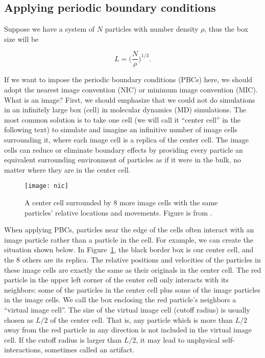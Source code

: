 \subsection{Applying periodic boundary conditions}\label{ssec:pbcs}

Suppose we have a system of \(N\) particles with number density \(\rho\), thus the
box size will be

\begin{equation}\label{eq:L}
    L = \biggl( \frac{ N }{ \rho } \biggr)^{1 / 3}.
\end{equation}

If we want to impose the periodic boundary conditions (PBCs) here, we should adopt the
nearest image convention (NIC) or minimum image convention (MIC). What is an image? First,
we should emphasize that we could not do simulations in an infinitely large box (cell) in
molecular dynamics (MD)
simulations. The most common solution is to take one cell (we will call it ``center cell''
in the following text) to simulate and imagine an infinitive number of image cells
surrounding it, where each image cell is a replica of the center cell. The image cells can
reduce or eliminate boundary effects by providing every particle an equivalent surrounding
environment of particles as if it were in the bulk, no matter where they are in the center
cell.

\begin{figure}[h]
    \centering
    \texttt{[image: nic]}
    \caption{A center cell surrounded by \(8\) more image cells with the same
        particles' relative locations and movements. Figure is from \cite{matlab}.}
    \label{fig:nic}
\end{figure}

When applying PBCs, particles near the edge of the cells often interact
with an image particle rather than a particle in the cell. For example, we can create the
situation shown below.
In Figure~\ref{fig:nic}, the black border box is our center cell, and the \(8\) others are
its replica. The relative positions and velocities of the particles in these image cells
are exactly the same as their originals in the center cell. The red particle in the
upper left corner of the center cell only interacts with its neighbors: some of the
particles in the center cell plus some of the image particles in the image cells.
We call the box enclosing the red particle's neighbors a ``virtual image cell''.
The size of the virtual image cell (cutoff radius) is usually chosen as \(L / 2\)
of the center cell. That is, any particle which is more than \(L / 2\) away from the
red particle in any direction is not included in the virtual image cell.
If the cutoff radius is larger than \(L / 2\), it may lead to
unphysical self-interactions, sometimes called an artifact.

